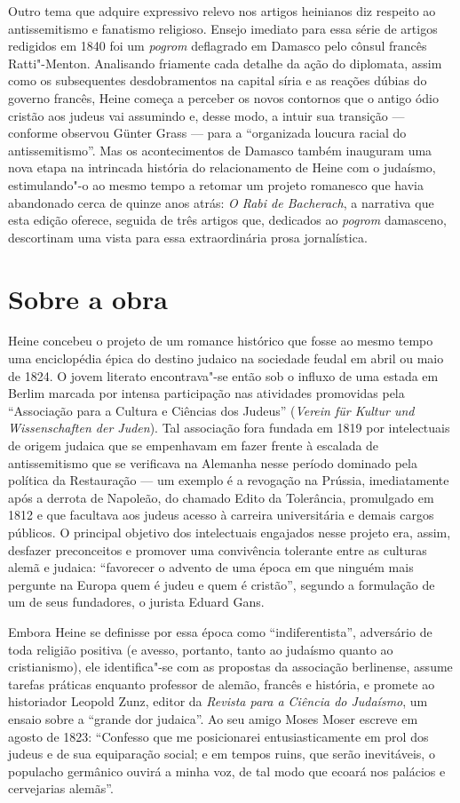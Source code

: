 Outro tema que adquire expressivo relevo nos artigos heinianos diz
respeito ao antissemitismo e fanatismo religioso. Ensejo imediato
para essa série de artigos redigidos em 1840 foi um \textit{pogrom}
deflagrado em Damasco pelo cônsul francês Ratti"-Menton. Analisando
friamente cada detalhe da ação do diplomata, assim como os subsequentes
desdobramentos na capital síria e as reações dúbias do governo francês,
Heine começa a perceber os novos contornos que o antigo ódio cristão
aos judeus vai assumindo e, desse modo, a intuir sua transição ---
conforme observou Günter Grass --- para a “organizada loucura racial do
antissemitismo”. Mas os acontecimentos de Damasco também inauguram
uma nova etapa na intrincada história do relacionamento de Heine com o
judaísmo, estimulando"-o ao mesmo tempo a retomar um projeto romanesco
que havia abandonado cerca de quinze anos atrás: \textit{O Rabi de
Bacherach}, a narrativa que esta edição oferece,
seguida de três artigos que,
dedicados ao \textit{pogrom} damasceno, descortinam uma vista para essa
extraordinária prosa jornalística.

\section{Sobre a obra}

Heine concebeu o projeto de um romance histórico que fosse ao mesmo
tempo uma enciclopédia épica do destino judaico na sociedade feudal em
abril ou maio de 1824. O jovem literato encontrava"-se então sob o
influxo de uma estada em Berlim marcada por intensa participação nas
atividades promovidas pela “Associação para a Cultura e Ciências dos
Judeus” (\textit{Verein für Kultur und Wissenschaften der Juden}). Tal
associação fora fundada em 1819 por intelectuais de origem judaica que
se empenhavam em fazer frente à escalada de antissemitismo que se
verificava na Alemanha nesse período dominado pela política da
Restauração --- um exemplo é a revogação na Prússia, imediatamente após a
derrota de Napoleão, do chamado Edito da Tolerância, promulgado em 1812
e que facultava aos judeus acesso à carreira universitária e demais
cargos públicos. O principal objetivo dos intelectuais engajados nesse
projeto era, assim, desfazer preconceitos e promover uma convivência
tolerante entre as culturas alemã e judaica: “favorecer o advento de
uma época em que ninguém mais pergunte na Europa quem é judeu e quem é
cristão”, segundo a formulação de um de seus fundadores, o jurista
Eduard Gans.

Embora Heine se definisse por essa época como “indiferentista”,
adversário de toda religião positiva (e avesso, portanto, tanto ao
judaísmo quanto ao cristianismo), ele identifica"-se com as propostas
da associação berlinense, assume tarefas práticas enquanto professor de
alemão, francês e história, e promete ao historiador Leopold Zunz,
editor da \textit{Revista para a Ciência do Judaísmo}, um ensaio sobre
a “grande dor judaica”. Ao seu amigo Moses Moser escreve em agosto de
1823: “Confesso que me posicionarei entusiasticamente em prol dos
judeus e de sua equiparação social; e em tempos ruins, que serão
inevitáveis, o populacho germânico ouvirá a minha voz, de tal modo que
ecoará nos palácios e cervejarias alemãs”.

